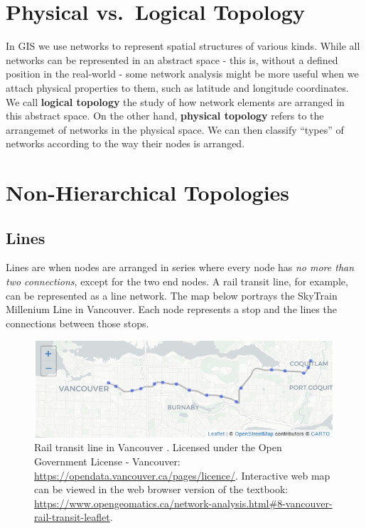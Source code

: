 \documentclass[
]{book}
\begin{document}
\section{Physical vs.~Logical Topology}\label{physical-vs.-logical-topology}

In GIS we use networks to represent spatial structures of various kinds. While all networks can be represented in an abstract space - this is, without a defined position in the real-world - some network analysis might be more useful when we attach physical properties to them, such as latitude and longitude coordinates. We call \textbf{logical topology} the study of how network elements are arranged in this abstract space. On the other hand, \textbf{physical topology} refers to the arrangemet of networks in the physical space. We can then classify ``types'' of networks according to the way their nodes is arranged.

\section{Non-Hierarchical Topologies}\label{non-hierarchical-topologies}

\subsection{Lines}\label{lines}

Lines are when nodes are arranged in series where every node has \emph{no more than two connections}, except for the two end nodes. A rail transit line, for example, can be represented as a line network. The map below portrays the SkyTrain Millenium Line in Vancouver. Each node represents a stop and the lines the connections between those stops.



\begin{figure}
\includegraphics[width=8.68in]{images/08-Rail-transit-line-in-Vancouver-static} \caption{Rail transit line in Vancouver \citep{city_of_vancouver_open_nodate}. Licensed under the Open Government License - Vancouver: \url{https://opendata.vancouver.ca/pages/licence/}. Interactive web map can be viewed in the web browser version of the textbook: \url{https://www.opengeomatics.ca/network-analysis.html\#8-vancouver-rail-transit-leaflet}.}\label{fig:8-vancouver-rail-transit-leaflet}
\end{figure}
\end{document}
